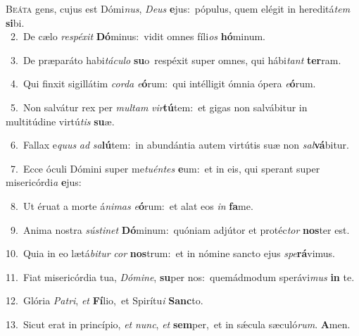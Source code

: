 \lettrine{\initial\textcolor{\initialcolor}{B}}{eáta} gens, cujus est Dómi\-\textit{nus}\-, \textit{De}\-\textit{us} \textbf{e}\-jus:~\star pópulus, quem elégit in hereditá\textit{tem} \textbf{si}\-bi.\\
{\numbfont\textcolor{\numbcolor}{~2.}}~De cælo \textit{re}\-\textit{spé}\textit{xit} \textbf{Dó}\-minus:~\star vidit omnes fíli\textit{os} \textbf{hó}\-minum.\par
{\numbfont\textcolor{\numbcolor}{~3.}}~De præparáto habi\-\textit{tá}\-\textit{cu}\textit{lo} \textbf{su}\-o~\star respéxit super omnes, qui hábi\textit{tant} \textbf{ter}\-ram.\par
{\numbfont\textcolor{\numbcolor}{~4.}}~Qui finxit sigillátim \textit{cor}\-\textit{da} \textit{e}\-\textbf{ó}rum:~\star qui intélligit ómnia ópera \textit{e}\-\textbf{ó}rum.\par
{\numbfont\textcolor{\numbcolor}{~5.}}~Non salvátur rex per \textit{mul}\-\textit{tam} \textit{vir}\-\textbf{tú}tem:~\star et gigas non salvábitur in multitúdine virtú\textit{tis} \textbf{su}\-æ.\par
{\numbfont\textcolor{\numbcolor}{~6.}}~Fallax e\textit{quus} \textit{ad} \textit{sa}\-\textbf{lú}tem:~\star in abundántia autem virtútis suæ non \textit{sal}\-\textbf{vá}bitur.\par
{\numbfont\textcolor{\numbcolor}{~7.}}~Ecce óculi Dómini super me\-\textit{tu}\-\textit{én}\textit{tes} \textbf{e}\-um:~\star et in eis, qui sperant super misericórdi\textit{a} \textbf{e}\-jus:\par
{\numbfont\textcolor{\numbcolor}{~8.}}~Ut éruat a morte á\-\textit{ni}\-\textit{mas} \textit{e}\-\textbf{ó}rum:~\star et alat eos \textit{in} \textbf{fa}\-me.\par
{\numbfont\textcolor{\numbcolor}{~9.}}~Anima nostra \textit{sús}\-\textit{ti}\textit{net} \textbf{Dó}\-minum:~\star quóniam adjútor et protéc\textit{tor} \textbf{nos}\-ter est.\par
{\numbfont\textcolor{\numbcolor}{10.}}~Quia in eo lætá\-\textit{bi}\-\textit{tur} \textit{cor} \textbf{nos}\-trum:~\star et in nómine sancto ejus \textit{spe}\-\textbf{rá}vimus.\par
{\numbfont\textcolor{\numbcolor}{11.}}~Fiat misericórdia tua, \textit{Dó}\-\textit{mi}\textit{ne}, \textbf{su}\-per nos:~\star quemádmodum sperávi\textit{mus} \textbf{in} te.\par
{\numbfont\textcolor{\numbcolor}{12.}}~Glória \textit{Pa}\-\textit{tri}, \textit{et} \textbf{Fí}\-lio,~\star et Spirítu\textit{i} \textbf{Sanc}\-to.\par
{\numbfont\textcolor{\numbcolor}{13.}}~Sicut erat in princípio, \textit{et} \textit{nunc}\-, \textit{et} \textbf{sem}\-per,~\star et in sǽcula sæculó\-\textit{rum}\-. \textbf{A}\-men.\par
